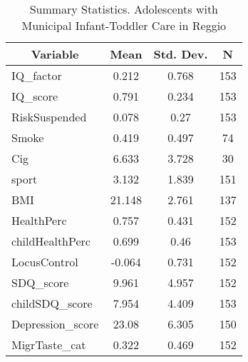 
\begin{table}[htbp]\centering \caption{Summary Statistics. Adolescents with Municipal Infant-Toddler Care in Reggio \label{bothAdolasiloMuniReggio}}
\begin{tabular}{l c c  c}\hline\hline
\multicolumn{1}{c}{\textbf{Variable}} & \textbf{Mean}
 & \textbf{Std. Dev.} & \textbf{N}\\ \hline
IQ\_factor & 0.212 & 0.768  & 153\\
IQ\_score & 0.791 & 0.234  & 153\\
RiskSuspended & 0.078 & 0.27  & 153\\
Smoke & 0.419 & 0.497  & 74\\
Cig & 6.633 & 3.728  & 30\\
sport & 3.132 & 1.839  & 151\\
BMI & 21.148 & 2.761  & 137\\
HealthPerc & 0.757 & 0.431  & 152\\
childHealthPerc & 0.699 & 0.46  & 153\\
LocusControl & -0.064 & 0.731  & 152\\
SDQ\_score & 9.961 & 4.957  & 152\\
childSDQ\_score & 7.954 & 4.409  & 153\\
Depression\_score & 23.08 & 6.305  & 150\\
MigrTaste\_cat & 0.322 & 0.469  & 152\\
\hline\end{tabular}
\end{table}
